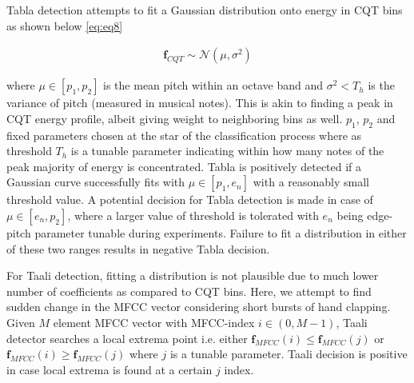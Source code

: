 \documentclass{article}
\begin{document}
Tabla detection attempts to fit a Gaussian distribution onto energy in CQT bins as shown below \ref{eq:eq8}

\begin{align}\label{eq:eq8}
\boldsymbol{f}_{CQT} \sim \mathcal{N}(\mu, \sigma^{2})
\end{align}

where $\mu \in [p_{1}, p_{2}]$ is the mean pitch within an octave band and $\sigma^{2} < T_{h}$ is the variance of pitch (measured in musical notes). This is akin to finding a peak in CQT energy profile, albeit giving weight to neighboring bins as well. $p_{1}$, $p_{2}$ and fixed parameters chosen at the star of the classification process where as threshold $T_{h}$ is a tunable parameter indicating within how many notes of the peak majority of energy is concentrated. Tabla is positively detected if a Gaussian curve successfully fits with $\mu \in [p_{1}, e_{n}]$ with a reasonably small threshold value. A potential decision for Tabla detection is made in case of $\mu \in [e_{n}, p_{2}]$, where a larger value of threshold is tolerated with $e_{n}$ being edge-pitch parameter tunable during experiments.  Failure to fit a distribution in either of these two ranges results in negative Tabla decision. 

For Taali detection, fitting a distribution is not plausible due to much lower number of coefficients as compared to CQT bins. Here, we attempt to find sudden change in the MFCC vector considering short bursts of hand clapping. Given $M$ element MFCC vector with MFCC-index $i \in (0, M-1)$, Taali detector searches a local extrema point i.e. either $\boldsymbol{f}_{MFCC}(i) \leq \boldsymbol{f}_{MFCC}(j)$ or $\boldsymbol{f}_{MFCC}(i) \geq \boldsymbol{f}_{MFCC}(j)$ where $j$ is a tunable parameter. Taali decision is positive in case local extrema is found at a certain $j$ index.
\end{document}
